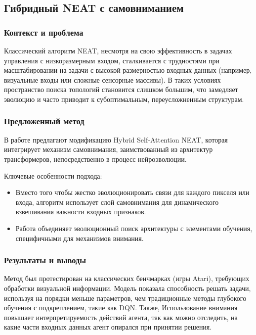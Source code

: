 \subsection{Гибридный NEAT с самовниманием}


\subsubsection{Контекст и проблема}

Классический алгоритм NEAT, несмотря на свою эффективность в задачах управления с низкоразмерным входом, сталкивается с трудностями при масштабировании на задачи с высокой размерностью входных данных (например, визуальные входы или сложные сенсорные массивы). В таких условиях пространство поиска топологий становится слишком большим, что замедляет эволюцию и часто приводит к субоптимальным, переусложненным структурам.


\subsubsection{Предложенный метод}

В работе \cite{khamesian2023} предлагают модификацию Hybrid Self-Attention NEAT, которая интегрирует механизм самовнимания, заимствованный из архитектур трансформеров, непосредственно в процесс нейроэволюции.​

Ключевые особенности подхода:

\begin{itemize}

  \item Вместо того чтобы жестко эволюционировать связи для каждого пикселя или входа, алгоритм использует слой самовнимания для динамического взвешивания важности входных признаков.

  \item Работа объединяет эволюционный поиск архитектуры с элементами обучения, специфичными для механизмов внимания.

\end{itemize}


\subsubsection{Результаты и выводы}

Метод был протестирован на классических бенчмарках (игры Atari), требующих обработки визуальной информации. Модель показала способность решать задачи, используя на порядки меньше параметров, чем традиционные методы глубокого обучения с подкреплением, такие как DQN. Также, Использование внимания повышает интерпретируемость действий агента, так как можно отследить, на какие части входных данных агент опирался при принятии решения.

